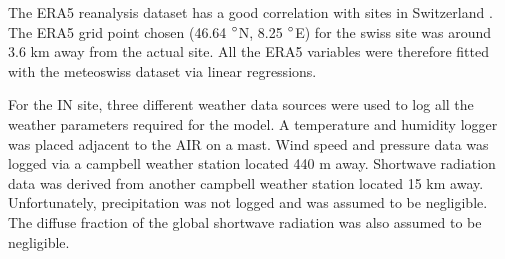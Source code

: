 \documentclass[utf8]{frontiersSCNS} %
\begin{document}
The ERA5 reanalysis dataset has a good correlation with sites in Switzerland \citep{Scherrer_2020}. The ERA5 grid point
chosen (46.64 $\degree$N, 8.25 $\degree$E) for the swiss site was around 3.6 km away from the actual site.  All the ERA5
variables were therefore fitted with the meteoswiss dataset via linear regressions.

For the IN site, three different weather data sources were used to log all the weather parameters required for the
model. A temperature and humidity logger was placed adjacent to the AIR on a mast. Wind speed and pressure data was
logged via a campbell weather station located 440 m away. Shortwave radiation data was derived from another campbell
weather station located 15 km away. Unfortunately, precipitation was not logged and was assumed to be negligible.
The diffuse fraction of the global shortwave radiation was also assumed to be negligible.
\end{document}
